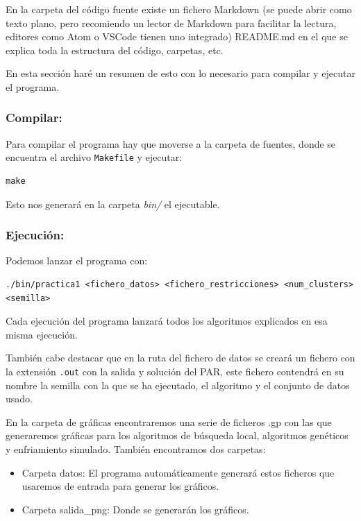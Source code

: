 \documentclass[12pt, spanish]{article}
\begin{document}
En la carpeta del código fuente existe un fichero Markdown (se puede abrir como texto plano, pero recomiendo un lector de Markdown para facilitar la lectura, editores como Atom o VSCode tienen uno integrado) README.md en el que se explica toda la estructura del código, carpetas, etc.

En esta sección haré un resumen de esto con lo necesario para compilar y ejecutar el programa.

\subsubsection{Compilar:}

Para compilar el programa hay que moverse a la carpeta de fuentes, donde se encuentra el archivo \texttt{Makefile} y ejecutar:

\begin{lstlisting}
make
\end{lstlisting}

Esto nos generará en la carpeta \textit{bin/} el ejecutable.




\subsubsection{Ejecución:}

Podemos lanzar el programa con:

\begin{lstlisting}
./bin/practica1 <fichero_datos> <fichero_restricciones> <num_clusters> <semilla>
\end{lstlisting}

Cada ejecución del programa lanzará todos los algoritmos explicados en esa misma ejecución.

También cabe destacar que en la ruta del fichero de datos se creará un fichero con la extensión \texttt{.out} con la salida y solución del PAR, este fichero contendrá en su nombre la semilla con la que se ha ejecutado, el algoritmo y el conjunto de datos usado.

En la carpeta de gráficas encontraremos una serie de ficheros .gp con las que generaremos gráficas para los algoritmos de búsqueda local, algoritmos genéticos y enfriamiento simulado. También encontramos dos carpetas:

\begin{itemize}
	\item Carpeta datos: El programa automáticamente generará estos ficheros que usaremos de entrada para generar los gráficos.
	\item Carpeta salida\_png: Donde se generarán los gráficos.
\end{itemize}
\end{document}
